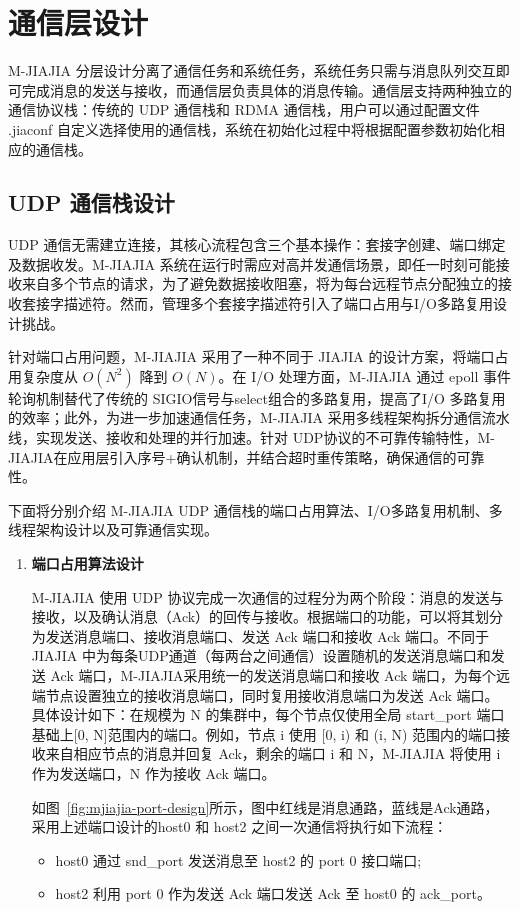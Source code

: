 {    \section{通信层设计}
    M-JIAJIA 分层设计分离了通信任务和系统任务，系统任务只需与消息队列交互即可完成消息的发送与接收，而通信层负责具体的消息传输。通信层支持两种独立的通信协议栈：传统的 UDP 通信栈和 RDMA 通信栈，用户可以通过配置文件 .jiaconf 自定义选择使用的通信栈，系统在初始化过程中将根据配置参数初始化相应的通信栈。

    \subsection{UDP 通信栈设计}
    UDP 通信无需建立连接，其核心流程包含三个基本操作：套接字创建、端口绑定及数据收发。M-JIAJIA 系统在运行时需应对高并发通信场景，即任一时刻可能接收来自多个节点的请求，为了避免数据接收阻塞，将为每台远程节点分配独立的接收套接字描述符。然而，管理多个套接字描述符引入了端口占用与I/O多路复用设计挑战。

    针对端口占用问题，M-JIAJIA 采用了一种不同于 JIAJIA  的设计方案，将端口占用复杂度从 $O(N^2)$ 降到 $O(N)$。在 I/O 处理方面，M-JIAJIA 通过 epoll 事件轮询机制替代了传统的 SIGIO信号与select组合的多路复用，提高了I/O 多路复用的效率；此外，为进一步加速通信任务，M-JIAJIA 采用多线程架构拆分通信流水线，实现发送、接收和处理的并行加速。针对 UDP协议的不可靠传输特性，M-JIAJIA在应用层引入序号+确认机制，并结合超时重传策略，确保通信的可靠性。

    下面将分别介绍 M-JIAJIA UDP 通信栈的端口占用算法、I/O多路复用机制、多线程架构设计以及可靠通信实现。
    \begin{enumerate}[label=\arabic*.]
        \item \textbf{端口占用算法设计}

              M-JIAJIA 使用 UDP 协议完成一次通信的过程分为两个阶段：消息的发送与接收，以及确认消息（Ack）的回传与接收。根据端口的功能，可以将其划分为发送消息端口、接收消息端口、发送 Ack 端口和接收 Ack 端口。不同于 JIAJIA 中为每条UDP通道（每两台之间通信）设置随机的发送消息端口和发送 Ack 端口，M-JIAJIA采用统一的发送消息端口和接收 Ack 端口，为每个远端节点设置独立的接收消息端口，同时复用接收消息端口为发送 Ack 端口。具体设计如下：在规模为 N 的集群中，每个节点仅使用全局 start\_port 端口基础上[0, N]范围内的端口。例如，节点 i 使用 [0, i) 和 (i, N) 范围内的端口接收来自相应节点的消息并回复 Ack，剩余的端口 i 和 N，M-JIAJIA 将使用 i 作为发送端口，N 作为接收 Ack 端口。

              如图~\ref{fig:mjiajia-port-design}所示，图中红线是消息通路，蓝线是Ack通路，采用上述端口设计的host0 和 host2 之间一次通信将执行如下流程：
              \begin{itemize}
                  \item host0 通过 snd\_port 发送消息至 host2 的 port 0 接口端口;
                  \item host2 利用 port 0 作为发送 Ack 端口发送 Ack 至 host0 的 ack\_port。
              \end{itemize}


\end{enumerate}}
